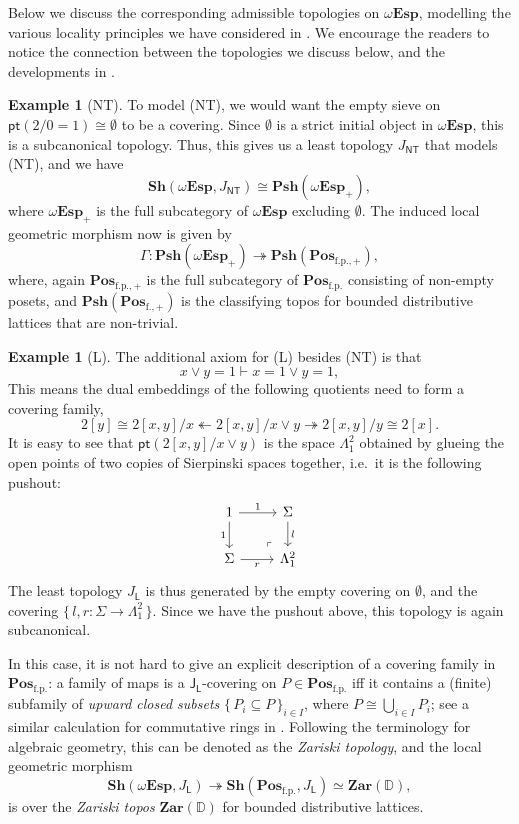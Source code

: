 \documentclass[a4paper,12pt]{amsart}
\theoremstyle{definition}
\newtheorem{example}[theorem]{Example}
\newcommand{\mb}[1]{\mathbf{#1}}
\newcommand{\mbb}[1]{\mathbb{#1}}
\newcommand{\mr}[1]{\mathrm{#1}}
\newcommand{\ms}[1]{\mathsf{#1}}
\newcommand{\Pos}{\mb{Pos}}
\newcommand{\sh}{\mb{Sh}}
\newcommand{\psh}{\mb{Psh}}
\newcommand{\set}[1]{\{\,#1\,\}}
\newcommand{\surj}{\twoheadrightarrow}
\newcommand{\fp}{_{\mr{f.p.}}}
\newcommand{\emp}{\emptyset}
\newcommand{\pt}{\ms{pt}}
\newcommand{\wTop}{\omega\mb{Esp}}
\begin{document}
Below we discuss the corresponding admissible topologies on $\wTop$, modelling the various locality principles we have considered in . We encourage the readers to notice the connection between the topologies we discuss below, and the developments in .

\begin{example}[NT]
  To model (NT), we would want the empty sieve on $\pt(2/0=1) \cong \emp$ to be a covering. Since $\emp$ is a strict initial object in $\wTop$, this is a subcanonical topology. Thus, this gives us a least topology $J_{\ms{NT}}$ that models (NT), and we have
  \[ \sh(\wTop,J_{\ms{NT}}) \cong \psh(\wTop_+), \]
  where $\wTop_+$ is the full subcategory of $\wTop$ excluding $\emp$. The induced local geometric morphism now is given by 
  \[ \Gamma \colon \psh(\wTop_+) \surj \psh(\Pos_{\mr{f.p.,+}}), \]
  where, again $\Pos_{\mr{f.p.,+}}$ is the full subcategory of $\Pos_{\mr{f.p.}}$ consisting of non-empty posets, and $\psh(\Pos_{\mr{f.,+}})$ is the classifying topos for bounded distributive lattices that are non-trivial.
\end{example}

\begin{example}[L]
  The additional axiom for (L) besides (NT) is that 
  \[ x \vee y = 1 \vdash x = 1 \vee y = 1, \] 
  This means the dual embeddings of the following quotients need to form a covering family,
  \[ 2[y] \cong 2[x,y]/x \twoheadleftarrow 2[x,y]/x\vee y \surj 2[x,y]/y \cong 2[x]. \]
  It is easy to see that $\pt(2[x,y]/x \vee y)$ is the space $\Lambda^2_1$ obtained by glueing the open points of two copies of Sierpinski spaces together, i.e.\ it is the following pushout:
  \[
  \begin{tikzcd}
    1 \ar[d, "1"'] \ar[r, "1"] & \Sigma \ar[d, "l"] \\ 
    \Sigma \ar[r, "r"'] & \Lambda^2_1
    \arrow["\lrcorner"{anchor=center, pos=0.125, rotate=180}, draw=none, from=2-2, to=1-1]    
  \end{tikzcd}
  \]
  The least topology $J_{\ms L}$ is thus generated by the empty covering on $\emp$, and the covering $\set{l,r : \Sigma \to \Lambda^2_1}$. Since we have the pushout above, this topology is again subcanonical. 
  
  In this case, it is not hard to give an explicit description of a covering family in $\Pos\fp$: a family of maps is a $\ms J_{\ms L}$-covering on $P \in \Pos\fp$ iff it contains a (finite) subfamily of \emph{upward closed subsets} $\set{P_i\subseteq P}_{i\in I}$, where $P \cong \bigcup_{i\in I}P_i$; see a similar calculation for commutative rings in \citet[VIII. 6]{maclane1992sheaves}. Following the terminology for algebraic geometry, this can be denoted as the \emph{Zariski topology}, and the local geometric morphism
  \[ \sh(\wTop,J_{\ms L}) \surj \sh(\Pos\fp,J_{\ms L}) \simeq \mb{Zar}(\mbb D), \]
  is over the \emph{Zariski topos} $\mb{Zar}(\mbb D)$ for bounded distributive lattices.
\end{example}
\end{document}
